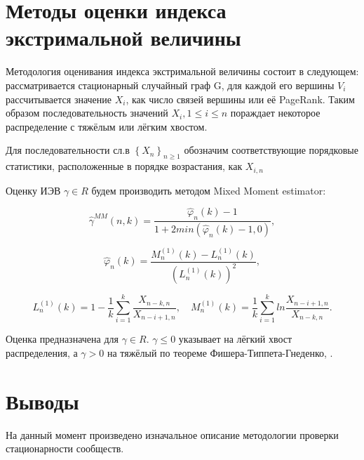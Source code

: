 \documentclass[a4paper,12pt]{article}
\begin{document}
\section{Методы оценки индекса экстримальной величины}
	Методология оценивания индекса экстримальной величины состоит в следующем: рассматривается стационарный случайный граф G, для каждой его вершины $V_{i}$ рассчитывается значение $X_{i}$, как число связей вершины или её PageRank. Таким образом последовательность значений $X_{i}, 1\leq i \leq n$ пораждает некоторое распределение с тяжёлым или лёгким хвостом. 
 
	Для последовательности сл.в $\left\{ X_{n} \right\}_{n \geq 1}$ обозначим соответствующие порядковые статистики, расположенные в порядке возрастания, как $X_{i,n}$
	
	Оценку ИЭВ $\gamma \in R$ будем производить методом Mixed Moment estimator:
	
		
\begin{equation}\label{F2}
\hat{\gamma}^{MM}(n,k)=\dfrac{\hat{\varphi}_{n}(k)-1}{1+2min(\hat{\varphi}_{n}(k) - 1,0)},
\end{equation}

\begin{equation}\label{F3}
\hat{\varphi}_{n}(k) = \dfrac{M_{n}^{(1)} (k) - L_{n}^{(1)} (k)}{(L_{n}^{(1)} (k))^{2}},
\end{equation}

\begin{equation}\label{F4}
L_{n}^{(1)} (k) = 1 - \dfrac{1}{k} \sum_{i=1}^k \dfrac{X_{n-k,n}}{X_{n-i+1,n}},
\quad
M_{n}^{(1)} (k) = \dfrac{1}{k} \sum_{i=1}^k ln\dfrac{X_{n-i+1,n}}{X_{n-k,n}}.
\end{equation}	
	
	Оценка предназначена для $\gamma \in R$. $\gamma \leq 0$ указывает на лёгкий хвост распределения, а $\gamma > 0$ на тяжёлый по теореме Фишера-Типпета-Гнеденко, \cite{book5}. 
		
\section{Выводы}
	 На данный момент произведено изначальное описание методологии проверки стационарности сообществ.



\newpage
 
\end{document}
